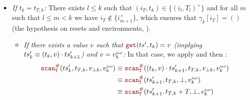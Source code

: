 \begin{skippableproof}
\begin{itemize}
        \item \textit{If $t_k = t_{T, k}$:} There exists $l \le k$ such that $(i_T, t_k)
                  \in \{(i_l, T_l)^+\}$ and for all $m$ such that $l \le m < k$ we have
              $i_T \notin \{i_{m+1}^+\}$, which ensures that $\gamma_k[i_T] = ()$ (\cf the
              hypothesis on resets and environments, ).

              \begin{itemize}
                  \item \textit{If there exists a value $v$ such that $\getAt{\ts'}{t_k} = v$
                        (implying $ts'_k \equiv (t_k, v) \cdot ts'_{k+1}$) and $v = v^{\textit{\tiny last}}_k$:}
                        In that case, we apply  and
                        then :
                        \begin{align*}
                            \scanAux{\ts'_k}{T}{t_{T, k}}{v_{\bot k}}{v^\explast_k} & \equiv
                            \scanAux{(t_k, v) \next \ts'_{k+1}}{T}{t_{T, k}}{v_{\bot k}}{v^\explast_k} \\
                                                                                    & \equiv
                            \scanAux{\ts'_{k+1}}{T}{t_{T, k}}{\bot}{v^\explast_k}                      \\
                                                                                    & \equiv
                            \scanAux{\ts'_{k+1}}{T}{t_{T, k} + T}{\bot}{v^\explast_k}
                        \end{align*}


\end{itemize}
\end{itemize}
\end{skippableproof}
